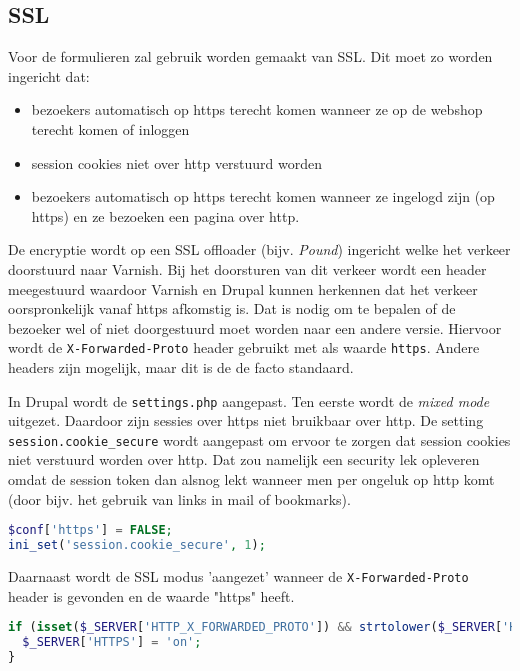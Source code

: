 \subsection{SSL}

Voor de formulieren zal gebruik worden gemaakt van SSL. Dit moet zo worden ingericht dat:
\begin{itemize}
\item bezoekers automatisch op https terecht komen wanneer ze op de webshop terecht komen of inloggen
\item session cookies niet over http verstuurd worden
\item bezoekers automatisch op https terecht komen wanneer ze ingelogd zijn (op https) en ze bezoeken een pagina over http.
\end{itemize}
 De encryptie wordt op een SSL offloader (bijv. \emph{Pound}) ingericht welke het verkeer doorstuurd naar Varnish. Bij het doorsturen van dit verkeer wordt een header meegestuurd waardoor Varnish en Drupal kunnen herkennen dat het verkeer oorspronkelijk vanaf https afkomstig is. Dat is nodig om te bepalen of de bezoeker wel of niet doorgestuurd moet worden naar een andere versie. Hiervoor wordt de \texttt{X-Forwarded-Proto} header gebruikt met als waarde \texttt{https}. Andere headers zijn mogelijk, maar dit is de de facto standaard.

In Drupal wordt de \texttt{settings.php} aangepast. Ten eerste wordt de \emph{mixed mode} uitgezet. Daardoor zijn sessies over https niet bruikbaar over http. De setting \texttt{session.cookie\_secure} wordt aangepast om ervoor te zorgen dat session cookies niet verstuurd worden over http. Dat zou namelijk een security lek opleveren omdat de session token dan alsnog lekt wanneer men per ongeluk op http komt (door bijv. het gebruik van links in mail of bookmarks).

\begin{lstlisting}[language=PHP]
$conf['https'] = FALSE;
ini_set('session.cookie_secure', 1);
\end{lstlisting}

Daarnaast wordt de SSL modus 'aangezet' wanneer de \texttt{X-Forwarded-Proto} header is gevonden en de waarde "https" heeft.

\begin{lstlisting}[language=PHP]
if (isset($_SERVER['HTTP_X_FORWARDED_PROTO']) && strtolower($_SERVER['HTTP_X_FORWARDED_PROTO']) == 'https') {
  $_SERVER['HTTPS'] = 'on';
}
\end{lstlisting}

